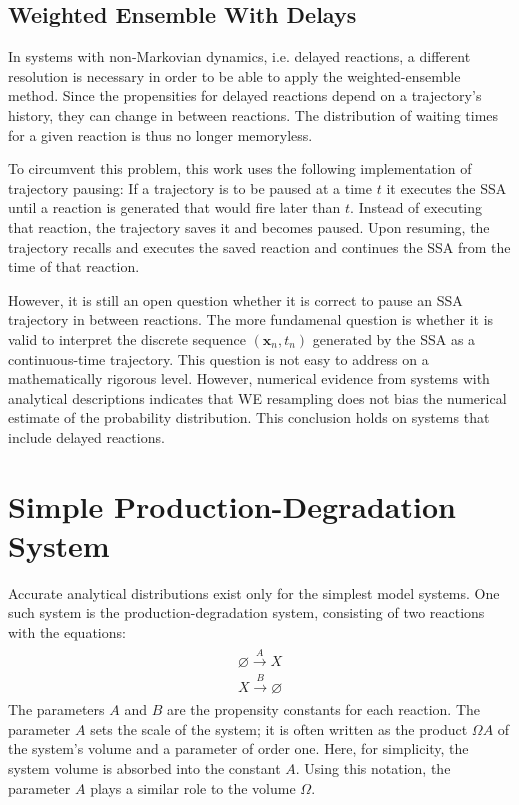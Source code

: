 \documentclass[english,letterpaper,12pt]{article}
\renewcommand{\vec}[1]{\ensuremath{\mathbf{#1}}}
\begin{document}
\begin{doublespacing}

\subsection{Weighted Ensemble With Delays} %
\label{sub:we-delays}

In systems with non-Markovian dynamics, i.e. delayed reactions, a different resolution is necessary in order to be able to apply the weighted-ensemble method. Since the propensities for delayed reactions depend on a trajectory's history, they can change in between reactions. The distribution of waiting times for a given reaction is thus no longer memoryless.

To circumvent this problem, this work uses the following implementation of trajectory pausing: If a trajectory is to be paused at a time $t$ it executes the SSA until a reaction is generated that would fire later than $t$. Instead of executing that reaction, the trajectory saves it and becomes paused. Upon resuming, the trajectory recalls and executes the saved reaction and continues the SSA from the time of that reaction.

However, it is still an open question whether it is correct to pause an SSA trajectory in between reactions. The more fundamenal question is whether it is valid to interpret the discrete sequence $(\vec{x}_n, t_n)$ generated by the SSA as a continuous-time trajectory. This question is not easy to address on a mathematically rigorous level. However, numerical evidence from systems with analytical descriptions indicates that WE resampling does not bias the numerical estimate of the probability distribution. This conclusion holds on systems that include delayed reactions.



\section{Simple Production-Degradation System} %
\label{sec:simple-pd}

Accurate analytical distributions exist only for the simplest model systems. One such system is the production-degradation system, consisting of two reactions with the equations:
\begin{align}
    \begin{gathered}
        \varnothing \xrightarrow{A} X \\
        X \xrightarrow {B} \varnothing
    \end{gathered}
    \label{eq:prod-deg-rxn}
\end{align}
The parameters $A$ and $B$ are the propensity constants for each reaction. The parameter $A$ sets the scale of the system; it is often written as the product $\Omega A$ of the system's volume and a parameter of order one. Here, for simplicity, the system volume is absorbed into the constant $A$. Using this notation, the parameter $A$ plays a similar role to the volume $\Omega$.


\end{doublespacing}
\end{document}
